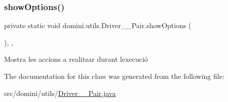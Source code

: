 \mbox{\label{classdomini_1_1utils_1_1Driver____Pair_a97596378f21ba4ab9c0c4ccb4041425b}} 
\subsubsection{\texorpdfstring{show\+Options()}{showOptions()}}
{\footnotesize\ttfamily private static void domini.\+utils.\+Driver\+\_\+\+\_\+\+Pair.\+show\+Options (\begin{DoxyParamCaption}{ }\end{DoxyParamCaption})\hspace{0.3cm}{\ttfamily [inline]}, {\ttfamily [static]}, {\ttfamily [private]}}



Mostra les accions a realitzar durant l\textquotesingle{}execució 



The documentation for this class was generated from the following file\+:\begin{DoxyCompactItemize}
\item 
src/domini/utils/\hyperlink{Driver____Pair_8java}{Driver\+\_\+\+\_\+\+Pair.\+java}\end{DoxyCompactItemize}
